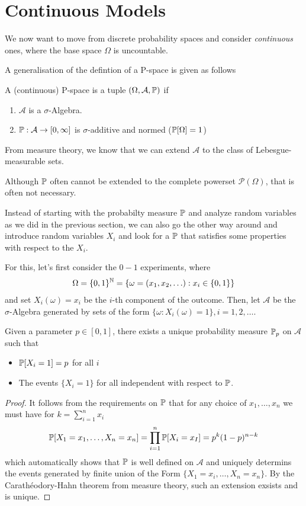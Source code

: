 \section{Continuous Models}
We now want to move from discrete probability spaces and consider \emph{continuous} ones, where the base space $\Omega$ is uncountable.

A generalisation of the defintion of a P-space is given as follows

\begin{dfn}[]
  A (continuous) P-space is a tuple $(\Omega,\mathcal{A},\mathbb{P})$ if
  \begin{enumerate}
    \item $\mathcal{A}$ is a $\sigma$-Algebra.
    \item $\mathbb{P}: \mathcal{A} \to [0,\infty]$ is $\sigma$-additive and normed ($\mathbb{P}[\Omega] = 1$)
  \end{enumerate}
\end{dfn}
From measure theory, we know that we can extend $\mathcal{A}$ to the class of Lebesgue-measurable sets.

Although $\mathbb{P}$ often cannot be extended to the complete powerset $\mathcal{P}(\Omega)$, that is often not necessary.

Instead of starting with the probabilty measure $\mathbb{P}$ and analyze random variables as we did in the previous section, 
we can also go the other way around and introduce random variables $X_i$ and look for a $\mathbb{P}$ that satisfies some properties with respect to the $X_i$.

For this, let's first consider the $0-1$ experiments, where
\begin{align*}
  \Omega = \{0,1\}^{\mathbb{N}} = \{\omega = (x_1,x_2,\ldots): x_i \in \{0,1\}\}
\end{align*}
and set $X_i(\omega) =x_i$ be the $i$-th component of the outcome.
Then, let $\mathcal{A}$ be the $\sigma$-Algebra generated by sets of the form $\{\omega: X_i(\omega) = 1\}, i = 1,2,\ldots$.
\begin{thm}[]
  Given a parameter $p \in [0,1]$, there exists a unique probability measure $\mathbb{P}_p$ on $\mathcal{A}$ such that
  \begin{itemize}
    \item $\mathbb{P}[X_i = 1] = p$ for all $i$
    \item The events $\{X_i = 1\}$ for all independent with respect to $\mathbb{P}$.
  \end{itemize}
\end{thm}
\begin{proof}
It follows from the requirements on $\mathbb{P}$ that for any choice of $x_1,\ldots,x_n$ we must have for $k = \sum_{i=1}^{n}x_i$
\begin{align*}
  \mathbb{P}[X_1=x_1,\ldots,X_n=x_n] = \prod_{i=1}^{n}\mathbb{P}[X_i=x_I]=p^{k}(1-p)^{n-k} 
\end{align*}
which automatically shows that $\mathbb{P}$ is well defined on $\mathcal{A}$ and uniquely determins the events generated by finite union of the Form $\{X_1 = x_i, \ldots, X_n = x_n\}$.
By the Carathéodory-Hahn theorem from measure theory, such an extension exsists and is unique.
\end{proof}


